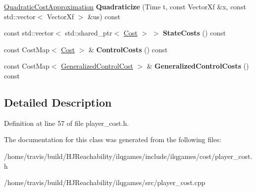 \begin{DoxyCompactItemize}
\item 
\hyperlink{structilqgames_1_1_quadratic_cost_approximation}{Quadratic\+Cost\+Approximation} {\bfseries Quadraticize} (Time t, const Vector\+Xf \&x, const std\+::vector$<$ Vector\+Xf $>$ \&us) const \hypertarget{classilqgames_1_1_player_cost_ad3962847f8eda8bcfecf2096e6abccb6}{}\label{classilqgames_1_1_player_cost_ad3962847f8eda8bcfecf2096e6abccb6}

\item 
const std\+::vector$<$ std\+::shared\+\_\+ptr$<$ \hyperlink{classilqgames_1_1_cost}{Cost} $>$ $>$ {\bfseries State\+Costs} () const \hypertarget{classilqgames_1_1_player_cost_aeaead26e5c4d0a845a8eed317cd12464}{}\label{classilqgames_1_1_player_cost_aeaead26e5c4d0a845a8eed317cd12464}

\item 
const Cost\+Map$<$ \hyperlink{classilqgames_1_1_cost}{Cost} $>$ \& {\bfseries Control\+Costs} () const \hypertarget{classilqgames_1_1_player_cost_a4fa0717c227acf2773deda56eaf62e99}{}\label{classilqgames_1_1_player_cost_a4fa0717c227acf2773deda56eaf62e99}

\item 
const Cost\+Map$<$ \hyperlink{classilqgames_1_1_generalized_control_cost}{Generalized\+Control\+Cost} $>$ \& {\bfseries Generalized\+Control\+Costs} () const \hypertarget{classilqgames_1_1_player_cost_a62ec3d489a4a89af14b9a17424981fa0}{}\label{classilqgames_1_1_player_cost_a62ec3d489a4a89af14b9a17424981fa0}

\end{DoxyCompactItemize}


\subsection{Detailed Description}


Definition at line 57 of file player\+\_\+cost.\+h.



The documentation for this class was generated from the following files\+:\begin{DoxyCompactItemize}
\item 
/home/travis/build/\+H\+J\+Reachability/ilqgames/include/ilqgames/cost/player\+\_\+cost.\+h\item 
/home/travis/build/\+H\+J\+Reachability/ilqgames/src/player\+\_\+cost.\+cpp\end{DoxyCompactItemize}
